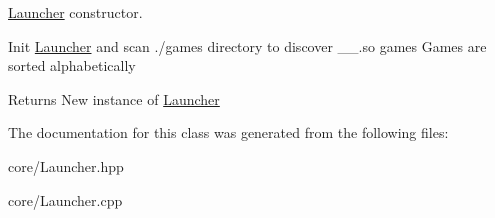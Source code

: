 \hyperlink{class_launcher}{Launcher} constructor. 

Init \hyperlink{class_launcher}{Launcher} and scan ./games directory to discover \+\_\+\+\_\+.\+so games Games are sorted alphabetically

\begin{DoxyReturn}{Returns}
New instance of \hyperlink{class_launcher}{Launcher} 
\end{DoxyReturn}


The documentation for this class was generated from the following files\+:\begin{DoxyCompactItemize}
\item 
core/Launcher.\+hpp\item 
core/Launcher.\+cpp\end{DoxyCompactItemize}
